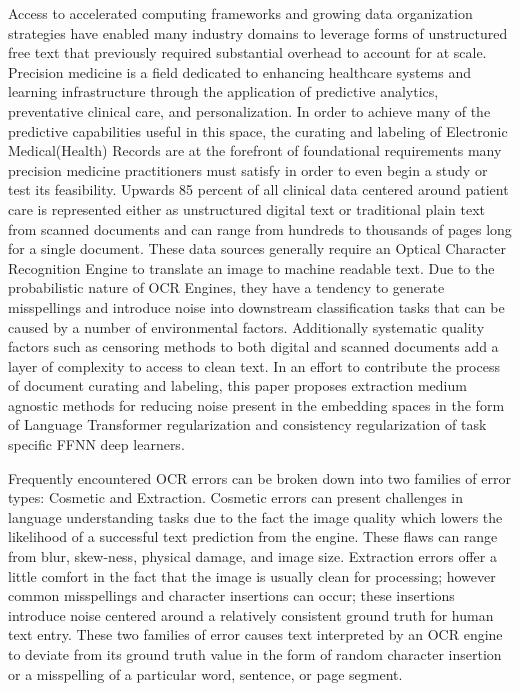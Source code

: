 \documentclass{article}
\begin{document}
Access to accelerated computing frameworks and growing data organization strategies have enabled many industry domains to leverage forms of unstructured free text that previously required substantial overhead to account for at scale. Precision medicine is a field dedicated to enhancing healthcare systems and learning infrastructure through the application of predictive analytics, preventative clinical care, and personalization. In order to achieve many of the predictive capabilities useful in this space, the curating and labeling of Electronic Medical(Health) Records are at the forefront of foundational requirements many precision medicine practitioners must satisfy in order to even begin a study or test its feasibility. Upwards 85 percent of all clinical data centered around patient care is represented either as unstructured digital text or traditional plain text from scanned documents and can range from hundreds to thousands of pages long for a single document. These data sources generally require an Optical Character Recognition Engine to translate an image to machine readable text. Due to the probabilistic nature of OCR Engines, they have a tendency to generate misspellings and introduce noise into downstream classification tasks that can be caused by a number of environmental factors. Additionally systematic quality factors such as censoring methods to both digital and scanned documents add a layer of complexity to access to clean text. In an effort to contribute the process of document curating and labeling, this paper proposes extraction medium agnostic methods for reducing noise present in the embedding spaces in the form of Language Transformer regularization and consistency regularization of task specific FFNN deep learners. 

Frequently encountered OCR errors can be broken down into two families of error types: Cosmetic and Extraction. Cosmetic errors can present challenges in language understanding tasks due to the fact the image quality which lowers the likelihood of a successful text prediction from the engine. These flaws can range from blur, skew-ness, physical damage, and image size. Extraction errors offer a little comfort in the fact that the image is usually clean for processing; however common misspellings and character insertions can occur; these insertions introduce noise centered around a relatively consistent ground truth for human text entry. These two families of error causes text interpreted by an OCR engine to deviate from its ground truth value in the form of random character insertion or a misspelling of a particular word, sentence, or page segment. 
\end{document}
